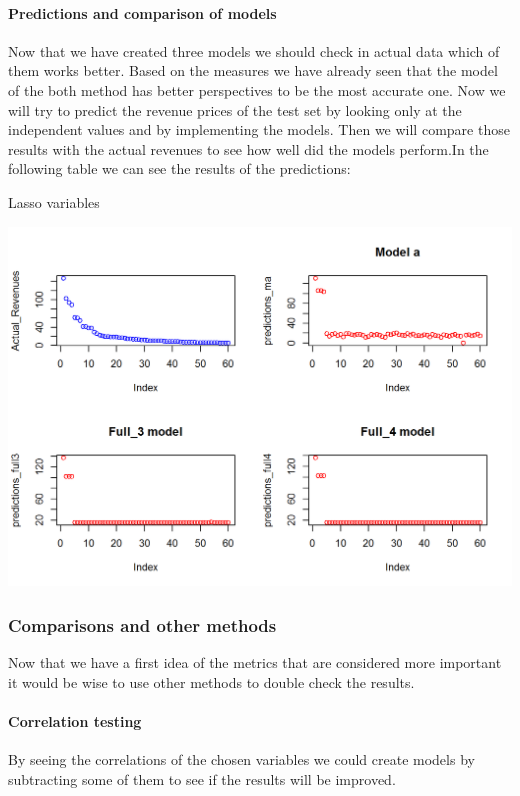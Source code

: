 \documentclass{article}
\begin{document}
\paragraph{Predictions and comparison of models}
Now that we have created three models we should check in actual data which of them works better. Based on the measures we have already seen that the model of the both method has better perspectives to be the most accurate one. Now we will try to predict the revenue prices of the test set by looking only at the independent values and by implementing the models. Then we will compare those results with the actual revenues to see how well did the models perform.In the following table we can see the results of the predictions:
\begin{table}[H]
\centering
\caption{Lasso variables}
\begin{center}
\includegraphics[scale=0.5]{../R/photos/85_pred_mod.png}    \\
\end{center}
\end{table}

\subsubsection{Comparisons and other methods}
Now that we have a first idea of the metrics that are considered more important it would be wise to use other methods to double check the results.
\paragraph{Correlation testing}
By seeing the correlations of the chosen variables we could create models by subtracting some of them to see if the results will be improved.
\end{document}
